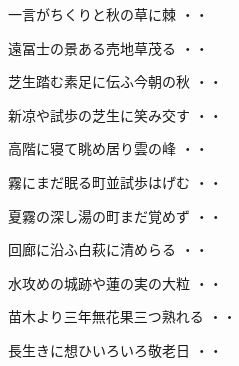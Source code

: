 \vspace{0.6cm}
\begin{shiika}一言がちくりと秋の草に棘
\hfill{・・}\end{shiika}
\vspace{0.6cm}
\begin{shiika}遠冨士の景ある売地草茂る
\hfill{・・}\end{shiika}
\vspace{0.6cm}
\begin{shiika}芝生踏む素足に伝ふ今朝の秋
\hfill{・・}\end{shiika}
\vspace{0.6cm}
\begin{shiika}新凉や試歩の芝生に笑み交す
\hfill{・・}\end{shiika}
\vspace{0.6cm}
\begin{shiika}高階に寝て眺め居り雲の峰
\hfill{・・}\end{shiika}
\vspace{0.6cm}
\begin{shiika}霧にまだ眠る町並試歩はげむ
\hfill{・・}\end{shiika}
\vspace{0.6cm}
\begin{shiika}夏霧の深し湯の町まだ覚めず
\hfill{・・}\end{shiika}
\vspace{0.6cm}
\begin{shiika}回廊に沿ふ白萩に清めらる
\hfill{・・}\end{shiika}
\vspace{0.6cm}
\begin{shiika}水攻めの城跡や蓮の実の大粒
\hfill{・・}\end{shiika}
\vspace{0.6cm}
\begin{shiika}苗木より三年無花果三つ熟れる
\hfill{・・}\end{shiika}
\vspace{0.6cm}
\begin{shiika}長生きに想ひいろいろ敬老日
\hfill{・・}\end{shiika}
